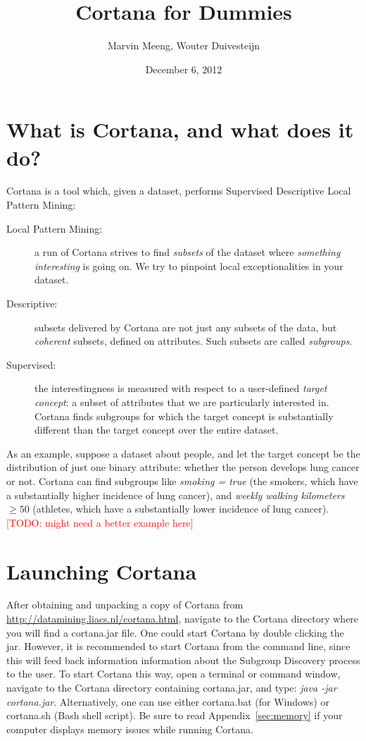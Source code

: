 \documentclass{article}
\title{Cortana for Dummies}
\author{Marvin Meeng, Wouter Duivesteijn}
\date{December 6, 2012}
\newcommand{\todo}[1]{\textcolor{red}{[TODO: #1]}}
\begin{document}
\maketitle

\section{What is Cortana, and what does it do?}
\label{sec:intro}

Cortana is a tool which, given a dataset, performs Supervised Descriptive
Local Pattern Mining:
\begin{description}
\item[Local Pattern Mining:] a run of Cortana strives to find \emph{subsets}
of the dataset where \emph{something interesting} is going on. We try to
pinpoint local exceptionalities in your dataset.
\item[Descriptive:] subsets delivered by Cortana are not just any subsets of
the data, but \emph{coherent} subsets, defined on attributes. Such subsets
are called \emph{subgroups}.
\item[Supervised:] the interestingness is measured with respect to a
user-defined \emph{target concept}: a subset of attributes that we are
particularly interested in. Cortana finds subgroups for which the target
concept is substantially different than the target concept over the entire
dataset.
\end{description}

As an example,
suppose a dataset about people, and let the target concept be the
distribution of just one binary attribute: whether the person develops lung
cancer or not.  Cortana can find subgroups like \emph{smoking = true} (the
smokers, which have a substantially higher incidence of lung cancer), and
\emph{weekly walking kilometers} $\geq 50$ (athletes, which have a
substantially lower incidence of lung cancer).
\todo{might need a better example here}

\section{Launching Cortana}

After obtaining and unpacking a copy of Cortana from
\url{http://datamining.liacs.nl/cortana.html}, navigate to the Cortana
directory where you will find a cortana.jar file.  One could start Cortana
by double clicking the jar.  However, it is recommended to start Cortana
from the command line, since this will feed back information information
about the Subgroup Discovery process to the user.  To start Cortana this
way, open a terminal or command window, navigate to the Cortana directory
containing cortana.jar, and type: \emph{java -jar cortana.jar}. 
Alternatively, one can use either cortana.bat (for Windows) or cortana.sh
(Bash shell script).  Be sure to read Appendix~\ref{sec:memory} if your
computer displays memory issues while running Cortana.
\end{document}
